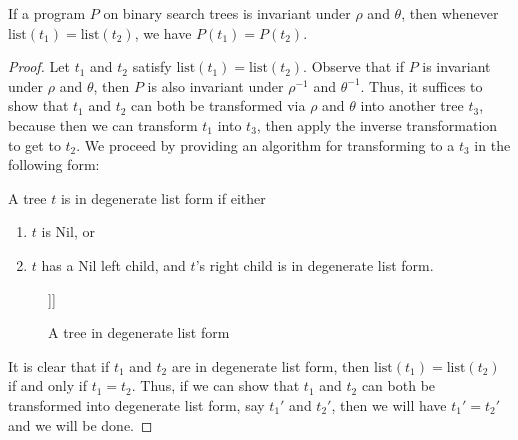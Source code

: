 \documentclass{llncs}
\newcommand{\e}{\emptyset}
\begin{document}
  \begin{theorem}
    If a program $P$ on binary search trees is invariant under $\rho$
    and $\theta$, then whenever $\mathrm{list}(t_1) = \mathrm{list}(t_2)$,
    we have $P(t_1) = P(t_2)$.
  \end{theorem}
  \begin{proof}
    Let $t_1$ and $t_2$ satisfy $\mathrm{list}(t_1) = \mathrm{list}(t_2)$.
    Observe that if $P$ is invariant under $\rho$ and $\theta$,
    then $P$ is also invariant under $\rho^{-1}$ and $\theta^{-1}$.
    Thus, it suffices to show that $t_1$ and $t_2$ can both be transformed
    via $\rho$ and $\theta$ into another tree $t_3$,
    because then we can transform $t_1$ into $t_3$, then apply the inverse
    transformation to get to $t_2$.
    We proceed by providing an algorithm for transforming to a $t_3$
    in the following form:

    \begin{definition}
      A tree $t$ is in degenerate list form if either
      \begin{enumerate}
        \item $t$ is Nil, or
        \item $t$ has a Nil left child, and $t$'s right child is in degenerate
          list form.
      \end{enumerate}
    \end{definition}

    \begin{figure}[H]
      \Tree [.a $\e$ [.b $\e$ [.c $\e$ d ]]]
      \caption{A tree in degenerate list form}
    \end{figure}

    It is clear that if $t_1$ and $t_2$ are in degenerate list form, then
    $\mathrm{list}(t_1) = \mathrm{list}(t_2)$ if and only if $t_1 = t_2$.
    Thus, if we can show that $t_1$ and $t_2$ can both be transformed into
    degenerate list form, say $t_1'$ and $t_2'$, then we will have $t_1' = t_2'$
    and we will be done.


\end{proof}
\end{document}
